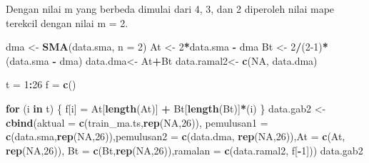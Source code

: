 \documentclass[
]{article}
\newenvironment{Shaded}{\begin{snugshade}}{\end{snugshade}}
\newcommand{\AttributeTok}[1]{\textcolor[rgb]{0.13,0.29,0.53}{#1}}
\newcommand{\ConstantTok}[1]{\textcolor[rgb]{0.56,0.35,0.01}{#1}}
\newcommand{\ControlFlowTok}[1]{\textcolor[rgb]{0.13,0.29,0.53}{\textbf{#1}}}
\newcommand{\DecValTok}[1]{\textcolor[rgb]{0.00,0.00,0.81}{#1}}
\newcommand{\FunctionTok}[1]{\textcolor[rgb]{0.13,0.29,0.53}{\textbf{#1}}}
\newcommand{\NormalTok}[1]{#1}
\newcommand{\OtherTok}[1]{\textcolor[rgb]{0.56,0.35,0.01}{#1}}
\newcommand{\SpecialCharTok}[1]{\textcolor[rgb]{0.81,0.36,0.00}{\textbf{#1}}}
\begin{document}
Dengan nilai m yang berbeda dimulai dari 4, 3, dan 2 diperoleh nilai
mape terekcil dengan nilai m = 2.

\begin{Shaded}
\begin{Highlighting}[]
\NormalTok{dma }\OtherTok{\textless{}{-}} \FunctionTok{SMA}\NormalTok{(data.sma, }\AttributeTok{n =} \DecValTok{2}\NormalTok{)}
\NormalTok{At }\OtherTok{\textless{}{-}} \DecValTok{2}\SpecialCharTok{*}\NormalTok{data.sma }\SpecialCharTok{{-}}\NormalTok{ dma}
\NormalTok{Bt }\OtherTok{\textless{}{-}} \DecValTok{2}\SpecialCharTok{/}\NormalTok{(}\DecValTok{2{-}1}\NormalTok{)}\SpecialCharTok{*}\NormalTok{(data.sma }\SpecialCharTok{{-}}\NormalTok{ dma)}
\NormalTok{data.dma}\OtherTok{\textless{}{-}}\NormalTok{ At}\SpecialCharTok{+}\NormalTok{Bt}
\NormalTok{data.ramal2}\OtherTok{\textless{}{-}} \FunctionTok{c}\NormalTok{(}\ConstantTok{NA}\NormalTok{, data.dma)}

\NormalTok{t }\OtherTok{=} \DecValTok{1}\SpecialCharTok{:}\DecValTok{26}
\NormalTok{f }\OtherTok{=} \FunctionTok{c}\NormalTok{()}

\ControlFlowTok{for}\NormalTok{ (i }\ControlFlowTok{in}\NormalTok{ t) \{}
\NormalTok{  f[i] }\OtherTok{=}\NormalTok{ At[}\FunctionTok{length}\NormalTok{(At)] }\SpecialCharTok{+}\NormalTok{ Bt[}\FunctionTok{length}\NormalTok{(Bt)]}\SpecialCharTok{*}\NormalTok{(i)}
\NormalTok{\}}
\NormalTok{data.gab2 }\OtherTok{\textless{}{-}} \FunctionTok{cbind}\NormalTok{(}\AttributeTok{aktual =} \FunctionTok{c}\NormalTok{(train\_ma.ts,}\FunctionTok{rep}\NormalTok{(}\ConstantTok{NA}\NormalTok{,}\DecValTok{26}\NormalTok{)), }\AttributeTok{pemulusan1 =} \FunctionTok{c}\NormalTok{(data.sma,}\FunctionTok{rep}\NormalTok{(}\ConstantTok{NA}\NormalTok{,}\DecValTok{26}\NormalTok{)),}\AttributeTok{pemulusan2 =} \FunctionTok{c}\NormalTok{(data.dma, }\FunctionTok{rep}\NormalTok{(}\ConstantTok{NA}\NormalTok{,}\DecValTok{26}\NormalTok{)),}\AttributeTok{At =} \FunctionTok{c}\NormalTok{(At, }\FunctionTok{rep}\NormalTok{(}\ConstantTok{NA}\NormalTok{,}\DecValTok{26}\NormalTok{)), }\AttributeTok{Bt =} \FunctionTok{c}\NormalTok{(Bt,}\FunctionTok{rep}\NormalTok{(}\ConstantTok{NA}\NormalTok{,}\DecValTok{26}\NormalTok{)),}\AttributeTok{ramalan =} \FunctionTok{c}\NormalTok{(data.ramal2, f[}\SpecialCharTok{{-}}\DecValTok{1}\NormalTok{]))}
\NormalTok{data.gab2}
\end{Highlighting}
\end{Shaded}
\end{document}
